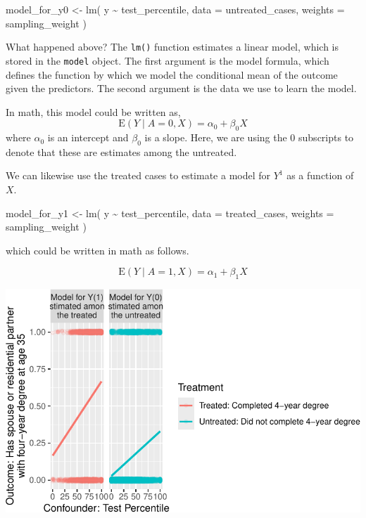 \documentclass[
  letterpaper,
  DIV=11,
  numbers=noendperiod]{scrartcl}
\newenvironment{Shaded}{\begin{snugshade}}{\end{snugshade}}
\newcommand{\AttributeTok}[1]{\textcolor[rgb]{0.40,0.45,0.13}{#1}}
\newcommand{\FunctionTok}[1]{\textcolor[rgb]{0.28,0.35,0.67}{#1}}
\newcommand{\NormalTok}[1]{\textcolor[rgb]{0.00,0.23,0.31}{#1}}
\newcommand{\OtherTok}[1]{\textcolor[rgb]{0.00,0.23,0.31}{#1}}
\newcommand{\SpecialCharTok}[1]{\textcolor[rgb]{0.37,0.37,0.37}{#1}}
\begin{document}
\begin{Shaded}
\begin{Highlighting}[]
\NormalTok{model\_for\_y0 }\OtherTok{\textless{}{-}} \FunctionTok{lm}\NormalTok{(}
\NormalTok{  y }\SpecialCharTok{\textasciitilde{}}\NormalTok{ test\_percentile, }
  \AttributeTok{data =}\NormalTok{ untreated\_cases,}
  \AttributeTok{weights =}\NormalTok{ sampling\_weight}
\NormalTok{)}
\end{Highlighting}
\end{Shaded}

What happened above? The \texttt{lm()} function estimates a linear
model, which is stored in the \texttt{model} object. The first argument
is the model formula, which defines the function by which we model the
conditional mean of the outcome given the predictors. The second
argument is the data we use to learn the model.

In math, this model could be written as, \[
\text{E}(Y\mid A = 0, X) = \alpha_0 + \beta_0 X
\] where \(\alpha_0\) is an intercept and \(\beta_0\) is a slope. Here,
we are using the 0 subscripts to denote that these are estimates among
the untreated.

We can likewise use the treated cases to estimate a model for \(Y^1\) as
a function of \(X\).

\begin{Shaded}
\begin{Highlighting}[]
\NormalTok{model\_for\_y1 }\OtherTok{\textless{}{-}} \FunctionTok{lm}\NormalTok{(}
\NormalTok{  y }\SpecialCharTok{\textasciitilde{}}\NormalTok{ test\_percentile, }
  \AttributeTok{data =}\NormalTok{ treated\_cases,}
  \AttributeTok{weights =}\NormalTok{ sampling\_weight}
\NormalTok{)}
\end{Highlighting}
\end{Shaded}

which could be written in math as follows.

\[
\text{E}(Y\mid A = 1, X) = \alpha_1 + \beta_1 X
\]

\includegraphics{models_for_causal_files/figure-pdf/unnamed-chunk-8-1.pdf}
\end{document}

